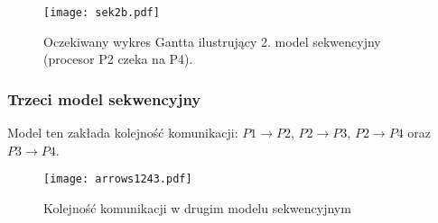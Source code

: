 \begin{figure}[!ht]
\centering
\texttt{[image: sek2b.pdf]}
\caption{Oczekiwany wykres Gantta ilustrujący 2. model sekwencyjny (procesor P2 czeka na P4).}
\label{fig:seq2b}
\end{figure}

\subsubsection{Trzeci model sekwencyjny}

Model ten zakłada kolejność komunikacji: $P1 \to P2$, $P2 \to P3$, $P2 \to P4$ oraz $P3 \to P4$. \\

\begin{figure}[!ht]
\centering
\texttt{[image: arrows1243.pdf]}
\caption{Kolejność komunikacji w drugim modelu sekwencyjnym}
\label{fig:seq3}
\end{figure}

